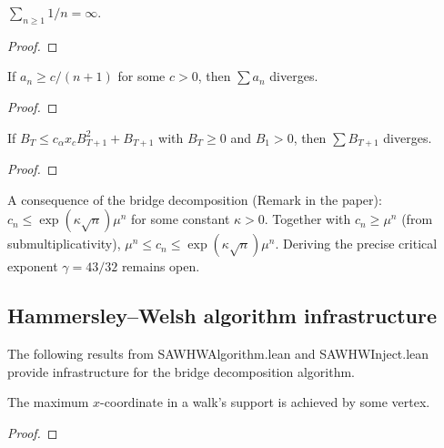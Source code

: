 \begin{theorem}\label{thm:harmonic}
\leanok
  $\sum_{n \geq 1} 1/n = \infty$.
\end{theorem}
\begin{proof}
\leanok
\end{proof}

\begin{theorem}\label{thm:harmonic_lower}
\leanok
{}
  If $a_n \geq c/(n{+}1)$ for some $c > 0$, then $\sum a_n$ diverges.
\end{theorem}
\begin{proof}
\leanok
{}
\end{proof}

\begin{theorem}\label{thm:case2_abstract}
\leanok
{}
  If $B_T \leq c_\alpha x_c B_{T+1}^2 + B_{T+1}$ with $B_T \geq 0$
  and $B_1 > 0$, then $\sum B_{T+1}$ diverges.
\end{theorem}
\begin{proof}
\leanok
{}
\end{proof}

\begin{definition}\label{def:hw_growth}
\leanok
{}
  A consequence of the bridge decomposition (Remark in the paper):
  $c_n \leq \exp(\kappa \sqrt{n}) \mu^n$ for some constant $\kappa > 0$.
  Together with $c_n \geq \mu^n$ (from submultiplicativity),
  $\mu^n \leq c_n \leq \exp(\kappa \sqrt{n}) \mu^n$.
  Deriving the precise critical exponent $\gamma = 43/32$ remains open.
\end{definition}

\subsection{Hammersley--Welsh algorithm infrastructure}

The following results from SAWHWAlgorithm.lean and SAWHWInject.lean provide
infrastructure for the bridge decomposition algorithm.

\begin{lemma}\label{lem:walk_max_achieved}
\leanok
{}
  The maximum $x$-coordinate in a walk's support is achieved by some vertex.
\end{lemma}
\begin{proof}
\leanok
\end{proof}

